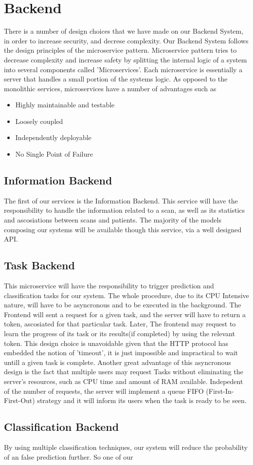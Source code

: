 	\section{Backend}
		There is a number of design choices that we have made on our Backend System, in order to increase security, and
		decrese complexity. Our Backend System follows the design principles of the microservice pattern. Microservice pattern
		tries to decrease complexity and increase safety by splitting the internal logic of a system into several components called
		'Microservices'. Each microservice is essentially a server that handles a small portion of the systems logic. As opposed to the
		monolithic services, microservices have a number of advantages such as
		\begin{itemize}
			\item Highly maintainable and testable
			\item Loosely coupled
			\item Independently deployable
			\item No Single Point of Failure
		\end{itemize}
		\subsection{Information Backend}
			The first of our services is the Information Backend. This service will have the responsibility to handle the information
			related to a scan, as well as its statistics and ascosiations between scans and patients. The majority of the models composing
			our systems will be available though this service, via a well designed API.
		\subsection{Task Backend}
			This microservice will have the responsibility to trigger prediction and classification tasks for our system. The whole procedure,
			due to its CPU Intensive nature, will have to be asyncronous and to be executed in the background. The Frontend will sent a request for
			a given task, and the server will have to return a token, ascosiated for that particular task. Later, The frontend may request to learn the
			progress of its task or its results(if completed) by using the relevant token. This design choice is unavoidable given that the HTTP protocol
			has embedded the notion of 'timeout', it is just impossible and impractical to wait untill a given task is complete. Another great advantage of 
			this asyncronous design is the fact that multiple users may request Tasks without eliminating the server's resources, such as CPU time and amount of
			RAM available. Indepedent of the number of requests, the server will implement a queue FIFO (First-In-First-Out) strategy and it will inform its users
			when the task is ready to be seen. 
		\subsection{Classification Backend}
			By using multiple classification techniques, our system will reduce the probability of an false prediction further. So one of our 
		
		
		
				
					
			
		
	
